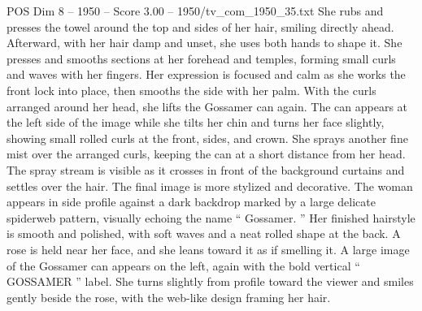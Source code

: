 \begin{textsample}{POS Dim 8 – 1950 – Score 3.00 – 1950/tv\_com\_1950\_35.txt}
She rubs and presses the towel around the top and sides of her hair, smiling directly ahead.
Afterward, with her hair damp and unset, she uses both hands to shape it.
She presses and smooths sections at her forehead and temples, forming small curls and waves with her fingers.
Her expression is focused and calm as she works the front lock into place, then smooths the side with her palm.
With the curls arranged around her head, she lifts the Gossamer can again.
The can appears at the left side of the image while she tilts her chin and turns her face slightly, showing small rolled curls at the front, sides, and crown.
She sprays another fine mist over the arranged curls, keeping the can at a short distance from her head.
The spray stream is visible as it crosses in front of the background curtains and settles over the hair.
The final image is more stylized and decorative.
The woman appears in side profile against a dark backdrop marked by a large delicate spiderweb pattern, visually echoing the name “ Gossamer. ” Her finished hairstyle is smooth and polished, with soft waves and a neat rolled shape at the back.
A rose is held near her face, and she leans toward it as if smelling it.
A large image of the Gossamer can appears on the left, again with the bold vertical “ GOSSAMER ” label.
She turns slightly from profile toward the viewer and smiles gently beside the rose, with the web-like design framing her hair.

\end{textsample}
